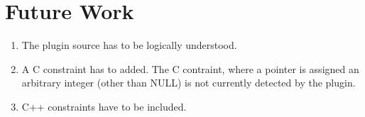 \section{Future Work}\label{sec:future-work}
\begin{enumerate}
    \item The plugin source has to be logically understood.
    \item A C constraint has to added. The C contraint, where a pointer is assigned an arbitrary integer (other than NULL) is not currently detected by the plugin.
    \item C++ constraints have to be included.
\end{enumerate}
